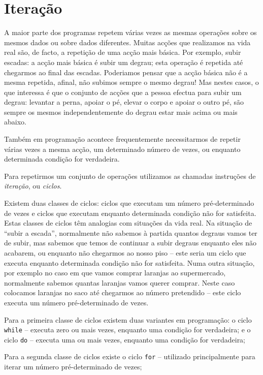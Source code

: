 \chapter{Iteração}\label{cap:iteraccao}

A maior parte dos programas repetem várias vezes as mesmas operações sobre os mesmos dados ou sobre dados
diferentes. 
Muitas acções que realizamos na vida real são, de facto, a repetição de uma acção mais básica. Por exemplo, subir escadas: a acção mais básica é subir um degrau; esta operação é repetida até chegarmos ao final das escadas. Poderiamos pensar que a acção básica não é a mesma repetida, afinal, não subimos sempre o mesmo degrau! Mas nestes casos, o que interessa é que o conjunto de acções que a pessoa efectua para subir um degrau: levantar a perna, apoiar o pé, elevar o corpo e apoiar o outro pé, são sempre os mesmos independentemente do degrau estar mais acima ou mais abaixo.

Também em programação acontece frequentemente necessitarmos de repetir várias vezes a mesma acção, um determinado número de vezes, ou enquanto determinada condição for verdadeira.

Para repetirmos um conjunto de operações utilizamos as chamadas instruções de \emph{iteração}, ou \emph{ciclos}.

Existem duas classes de ciclos: ciclos que executam um número pré-determinado de vezes e ciclos que executam enquanto determinada condição não for satisfeita. Estas classes de ciclos têm analogias com situações da vida real. Na situação de ``subir a escada'', normalmente não sabemos à partida quantos degraus vamos ter de subir, mas sabemos que temos de continuar a subir degraus enquanto eles não acabarem, ou enquanto não chegarmos ao nosso piso -- este seria um ciclo que executa enquanto determinada condição não for satisfeita. Numa outra situação, por exemplo no caso em que vamos comprar laranjas ao supermercado, normalmente sabemos quantas laranjas vamos querer comprar. Neste caso colocamos laranjas no saco até chegarmos ao número pretendido -- este ciclo executa um número pré-determinado de vezes.

Para a primeira classe de ciclos existem duas variantes em programação: o ciclo \texttt{while} -- executa zero ou mais vezes, enquanto uma condição for verdadeira; e o ciclo \texttt{do} -- executa uma ou mais vezes, enquanto uma condição for verdadeira; 

Para a segunda classe de ciclos existe o ciclo \texttt{for} -- utilizado principalmente para iterar um número pré-determinado de vezes; 


